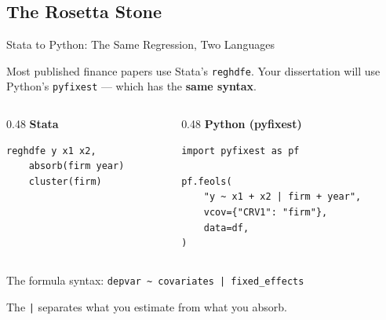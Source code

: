 \documentclass[9pt,aspectratio=169]{beamer}
\begin{document}
\subsection{The Rosetta Stone}

\begin{frame}[fragile]{Stata to Python: The Same Regression, Two Languages}

Most published finance papers use Stata's \texttt{reghdfe}. Your dissertation will use Python's \texttt{pyfixest} --- which has the \textbf{same syntax}.

\bigskip

\begin{columns}[T]
\begin{column}{0.48\textwidth}
\textbf{Stata}
\begin{lstlisting}[style=stata]
reghdfe y x1 x2,
    absorb(firm year)
    cluster(firm)
\end{lstlisting}
\end{column}
\begin{column}{0.48\textwidth}
\textbf{Python (pyfixest)}
\begin{lstlisting}
import pyfixest as pf

pf.feols(
    "y ~ x1 + x2 | firm + year",
    vcov={"CRV1": "firm"},
    data=df,
)
\end{lstlisting}
\end{column}
\end{columns}

\bigskip

The formula syntax: \texttt{depvar \textasciitilde{} covariates | fixed\_effects}

\medskip

The \texttt{|} separates what you estimate from what you absorb.

\end{frame}
\end{document}
